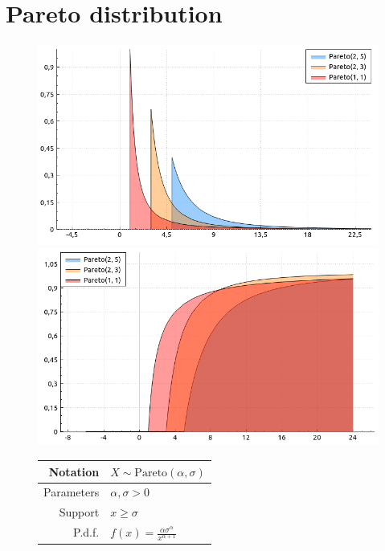 \documentclass[a4paper,11pt]{article}
\theoremstyle{plain}
\theoremstyle{definition}
\begin{document}
\section{Pareto distribution}
			\begin{figure}[!htb]\centering
				\begin{minipage}{0.55\textwidth}
					\includegraphics[width=\linewidth, right]{pareto_pdf}
					\captionsetup{labelformat=empty}
					\includegraphics[width=\linewidth, right]{pareto_cdf}
					\captionsetup{labelformat=empty}
				\end{minipage}
				\begin{minipage}{0.4\textwidth}
					\begin{tabular}{| r | l |}
						\hline
						Notation & $X \sim \mathrm{Pareto}(\alpha, \sigma)$ \\
						\hline
						Parameters & $\alpha,  \sigma > 0 $ \\
						\hline
						Support & $x \geq \sigma$  \\
						\hline
						P.d.f. & $f(x)= \frac{\alpha \sigma^\alpha}{x^{\alpha+1}}  $ \\

\end{tabular}
\end{minipage}
\end{figure}
\end{document}
